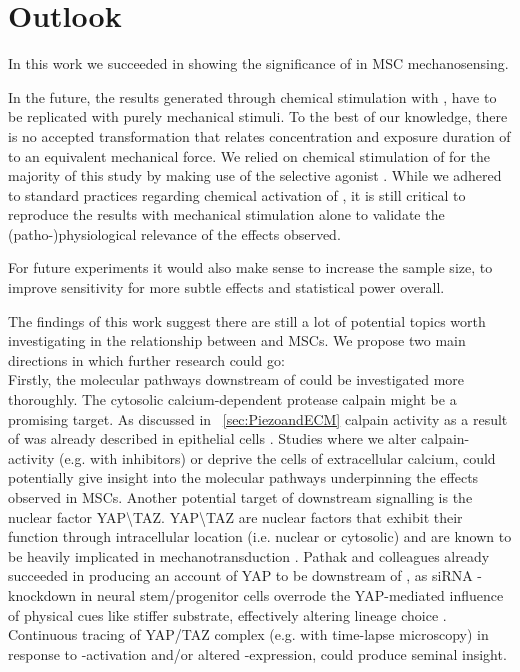 \chapter{Outlook}
In this work we succeeded in showing the significance of \Piezo{} in MSC mechanosensing.

In the future, the results generated through chemical stimulation with \Yoda{}, have to be replicated with purely mechanical stimuli. To the best of our knowledge, there is no accepted transformation that relates concentration and exposure duration of \Yoda{} to an equivalent mechanical force. We relied on chemical stimulation of \Piezo{} for the majority of this study by making use of the selective \Piezo{} agonist \Yoda{}. While we adhered to standard practices regarding chemical activation of \Piezo{}\cite{Morley2018}, it is still critical to reproduce the results with mechanical stimulation alone to validate the (patho-)physiological relevance of the effects observed. \par

For future experiments it would also make sense to increase the sample size, to improve sensitivity for more subtle effects and statistical power overall. \par

The findings of this work suggest there are still a lot of potential topics worth investigating in the relationship between \Piezo{} and MSCs. We propose two main directions in which further research could go:\\
Firstly, the molecular pathways downstream of \Piezo{} could be investigated more thoroughly. The cytosolic calcium-dependent protease calpain might be a promising target. As discussed in ~\vref{sec:PiezoandECM} calpain activity as a result of \Piezo{} was already described in epithelial cells \cite{McHugh2010}. Studies where we alter calpain-activity (e.g. with inhibitors) or deprive the cells of extracellular calcium, could potentially give insight into the molecular pathways underpinning the effects observed in MSCs. Another potential target of \Piezo{} downstream signalling is the nuclear factor YAP\textbackslash{}TAZ. YAP\textbackslash{}TAZ are nuclear factors that exhibit their function through intracellular location (i.e. nuclear or cytosolic) and are known to be heavily implicated in mechanotransduction \cite{Dupont2011}. Pathak and colleagues already succeeded in producing an account of YAP to be downstream of \Piezo{}, as siRNA \Piezo{}-knockdown in neural stem/progenitor cells overrode the YAP-mediated influence of physical cues like stiffer substrate, effectively altering lineage choice \cite{Pathak2014}. Continuous tracing of YAP/TAZ complex (e.g. with time-lapse microscopy) in response to \Yoda{}-activation and/or altered \Piezo{}-expression, could produce seminal insight.\par

